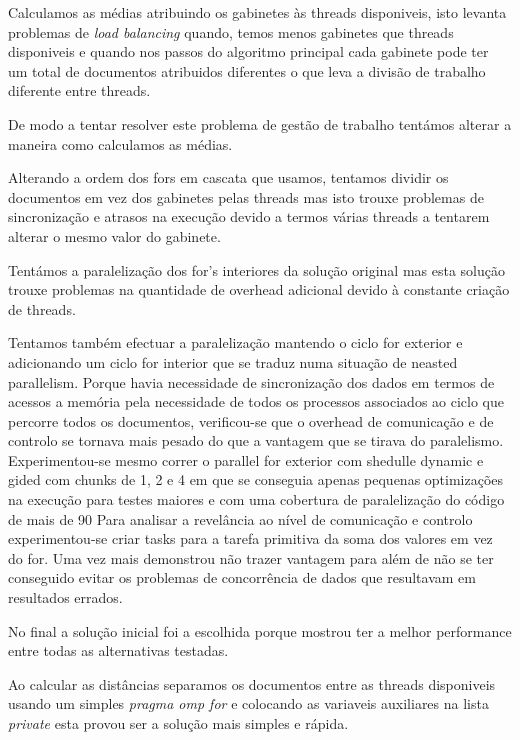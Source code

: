 \documentclass[times, 10pt,twocolumn]{article}
\begin{document}
Calculamos as médias atribuindo os gabinetes às threads disponiveis, isto levanta problemas de \emph {load balancing} quando, temos menos gabinetes que threads disponiveis e quando nos passos do algoritmo principal cada gabinete pode ter um total de documentos atribuidos diferentes o que leva a divisão de trabalho diferente entre threads.

De modo a tentar resolver este problema de gestão de trabalho tentámos alterar a maneira como calculamos as médias.

Alterando a ordem dos fors em cascata que usamos, tentamos dividir os documentos em vez dos gabinetes pelas threads mas isto trouxe problemas de sincronização e atrasos na execução devido a termos várias threads a tentarem alterar o mesmo valor do gabinete.

Tentámos a paralelização dos for’s interiores da solução original mas esta solução trouxe problemas na quantidade de overhead adicional devido à constante criação de threads.

Tentamos também efectuar a paralelização mantendo o ciclo for exterior e adicionando um ciclo for interior que se traduz numa situação de neasted parallelism. Porque havia necessidade de sincronização dos dados em termos de acessos a memória pela necessidade de todos os processos associados ao ciclo que percorre todos os documentos, verificou-se que o overhead de comunicação e de controlo se tornava mais pesado do que a vantagem que se tirava do paralelismo. 
Experimentou-se mesmo correr o parallel for exterior com shedulle dynamic e gided com chunks de 1, 2 e 4 em que se conseguia apenas pequenas optimizações na execução para testes maiores e com uma cobertura de paralelização do código de mais de 90%
Para analisar a revelância ao nível de comunicação e controlo experimentou-se criar tasks para a tarefa primitiva da soma dos valores em vez do for. Uma vez mais demonstrou não trazer vantagem para além de não se ter conseguido evitar os problemas de concorrência de dados que resultavam em resultados errados.

No final a solução inicial foi a escolhida porque mostrou ter a melhor performance entre todas as alternativas testadas.



Ao calcular as distâncias separamos os documentos entre as threads disponiveis usando um simples \emph{pragma omp for} e colocando as variaveis auxiliares na lista \emph{private} esta provou ser a solução mais simples e rápida.
\end{document}
